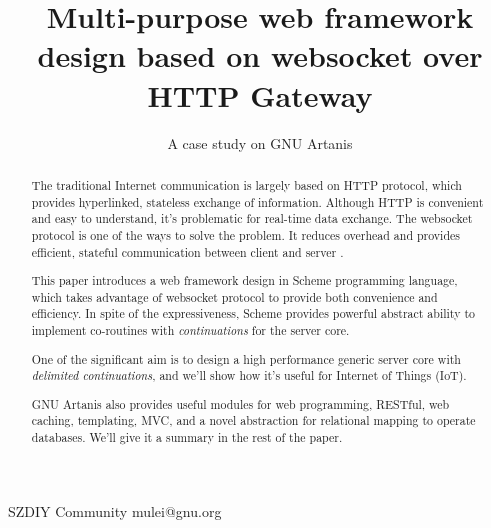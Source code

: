 \documentclass[numbers,numberedpars]{sigplanconf}
\begin{document}
\setlength{\pdfpageheight}{\paperheight}
\setlength{\pdfpagewidth}{\paperwidth}




\title{Multi-purpose web framework design based on websocket over HTTP Gateway}
\subtitle{A case study on GNU Artanis}

           {SZDIY Community}
           {mulei@gnu.org}

\maketitle

\begin{abstract}
  The traditional Internet communication is largely based on HTTP protocol, which provides hyperlinked, stateless exchange of information.
  Although HTTP is convenient and easy to understand, it's problematic for real-time data exchange. The websocket protocol is one of the ways
  to solve the problem. It reduces overhead and provides efficient, stateful communication between client and server \citep{6197172}.
  
  This paper introduces a web framework design in Scheme programming language, which takes advantage of websocket protocol to provide both
  convenience and efficiency. In spite of the expressiveness, Scheme provides powerful abstract ability to implement co-routines with
  {\it continuations} for the server core.

  One of the significant aim is to design a high performance generic server core with {\it delimited continuations}, and we'll show how it's useful
  for Internet of Things (IoT).
  
  GNU Artanis also provides useful modules for web programming, RESTful, web caching, templating, MVC, and a novel abstraction for relational
  mapping to operate databases. We'll give it a summary in the rest of the paper.
\end{abstract}
\end{document}

